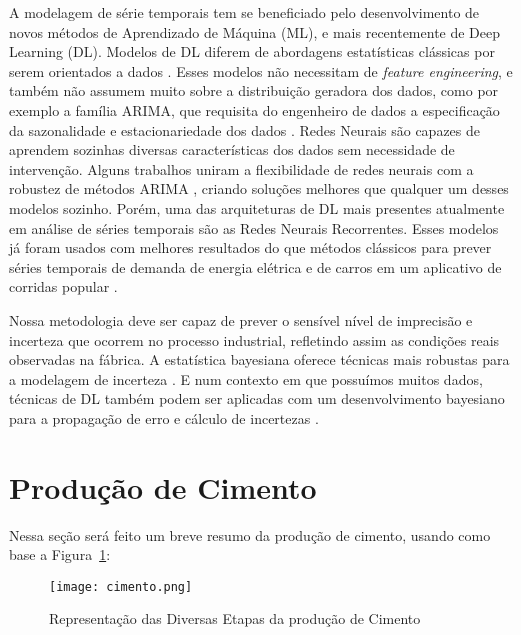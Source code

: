 A modelagem de série temporais tem se beneficiado pelo desenvolvimento de novos
métodos de Aprendizado de Máquina (ML), e mais recentemente de Deep Learning (DL).
Modelos de DL diferem de abordagens estatísticas clássicas por serem orientados
a dados \citep{dlbook}.
Esses modelos não necessitam de \textit{feature engineering}, e também não
assumem muito sobre a distribuição geradora dos dados, como por exemplo a
família ARIMA, que requisita do engenheiro de dados a especificação da
sazonalidade e estacionariedade dos dados \citep{arima}.
Redes Neurais são capazes de aprendem sozinhas diversas características dos dados sem necessidade de intervenção. 
Alguns trabalhos uniram a flexibilidade de redes neurais com a robustez de
métodos ARIMA \citep{DIAZROBLES20088331,KHASHEI2010479},
criando soluções melhores que qualquer um desses modelos sozinho. Porém, uma das
arquiteturas de DL mais presentes atualmente em análise de séries temporais
são as Redes Neurais Recorrentes. Esses modelos já foram usados com
melhores resultados do que métodos clássicos para prever séries temporais de
demanda de energia elétrica e de carros em um aplicativo de corridas popular
\citep{energylstm,ubertime}.


Nossa metodologia deve ser capaz de prever o sensível nível de imprecisão e
incerteza que ocorrem no processo industrial,
refletindo assim as condições reais observadas na fábrica. A estatística bayesiana oferece técnicas
mais robustas para a modelagem de incerteza \citep{bayesml}. E num contexto em
que possuímos muitos dados, técnicas de DL também podem ser aplicadas com um desenvolvimento bayesiano para a propagação de erro e cálculo de incertezas \citep{ubertime,Gal2016Uncertainty}. 



\section{Produção de Cimento}
\label{sec:producao}

Nessa seção será feito um breve resumo da produção de cimento, usando como base a Figura~\ref{fig:cimento}:  

\begin{figure}[H]
\centering
\texttt{[image: cimento.png]}
\caption{Representação das Diversas Etapas da produção de Cimento \citep{cementroadmap}}
\label{fig:cimento}
\end{figure}


